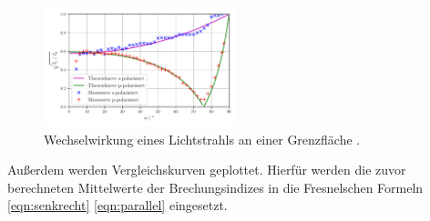 \begin{figure}[H]
  \centering
  \includegraphics[width=0.5\textwidth]{build/plot.pdf}
  \caption {Wechselwirkung eines Lichtstrahls an einer Grenzfläche \cite{V407}.}
  \label{fig:plot1}
\end{figure}

Außerdem werden Vergleichskurven geplottet. Hierfür werden die zuvor berechneten Mittelwerte der Brechungsindizes in die Fresnelschen
Formeln \eqref{eqn:senkrecht} \eqref{eqn:parallel} eingesetzt.







